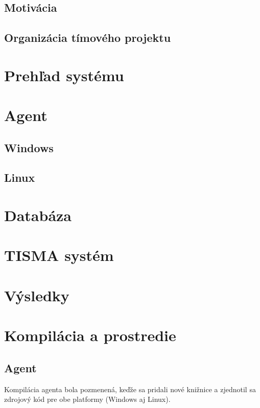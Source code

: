\documentclass[a4paper,12pt]{article}
\begin{document}
\subsection{Motivácia}
\subsection{Organizácia tímového projektu}
\newpage

\section{Prehľad systému}
\newpage
\section{Agent}
\subsection{Windows}

\subsection{Linux}
\newpage

\section{Databáza}
\newpage

\section{TISMA systém}
\newpage

\section{Výsledky}
\newpage

\section{Kompilácia a prostredie}

\subsection{Agent}

Kompilácia agenta bola pozmenená, keďže sa pridali nové knižnice a zjednotil sa zdrojový kód pre obe platformy (Windows aj Linux).
\end{document}
